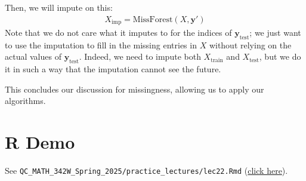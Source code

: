 \documentclass[12pt, a4paper]{article}
\theoremstyle{definition}
\begin{document}
	Then, we will impute on this:
	\begin{align*}
		X_{\text{imp}} = \text{MissForest}(X, \bm{y}')
	\end{align*}
	Note that we do not care what it imputes to for the indices of $\bm{y}_{\text{test}}$;
	we just want to use the imputation to fill in the missing entries in $X$ without relying
	on the actual values of $\bm{y}_{\text{test}}$. Indeed, we need to impute both
	$X_{\text{train}}$ and $X_{\text{test}}$, but we do it in such a way that the imputation
	cannot see the future.
	
	This concludes our discussion for missingness, allowing us to apply our algorithms.
	\section{R Demo}
	See \verb|QC_MATH_342W_Spring_2025/practice_lectures/lec22.Rmd|
	(\href{https://github.com/kapelner/QC_MATH_342W_Spring_2025/blob/main/practice_lectures/lec22.Rmd}{click here}).
\end{document}
